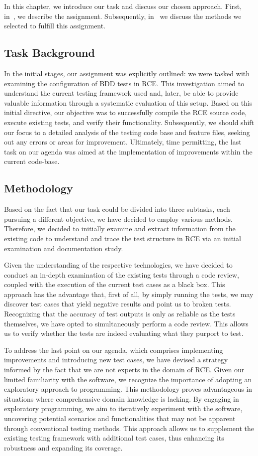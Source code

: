 In this chapter, we introduce our task and discuss our chosen approach. First, in~, we describe the assignment. Subsequently, in~ we discuss the methods we selected to fulfill this assignment.

\subsection{Task Background}
\label{subsec:Task}
In the initial stages, our assignment was explicitly outlined: we were tasked with examining the configuration of \ac{BDD} tests in \ac{RCE}. This investigation aimed to understand the current testing framework used and, later, be able to provide valuable information through a systematic evaluation of this setup. Based on this initial directive, our objective was to successfully compile the \ac{RCE} source code, execute existing tests, and verify their functionality. Subsequently, we should shift our focus to a detailed analysis of the testing code base and feature files, seeking out any errors or areas for improvement. Ultimately, time permitting, the last task on our agenda was aimed at the implementation of improvements within the current code-base.

\subsection{Methodology}
\label{subsec:Methodologies}
Based on the fact that our task could be divided into three subtasks, each pursuing a different objective, we have decided to employ various methods. Therefore, we decided to initially examine and extract information from the existing code to understand and trace the test structure in \ac{RCE} via an initial examination and documentation study.

Given the understanding of the respective technologies, we have decided to conduct an in-depth examination of the existing tests through a code review, coupled with the execution of the current test cases as a black box. This approach has the advantage that, first of all, by simply running the tests, we may discover test cases that yield negative results and point us to broken tests. Recognizing that the accuracy of test outputs is only as reliable as the tests themselves, we have opted to simultaneously perform a code review. This allows us to verify whether the tests are indeed evaluating what they purport to test. 

To address the last point on our agenda, which comprises implementing improvements and introducing new test cases, we have devised a strategy informed by the fact that we are not experts in the domain of \ac{RCE}. Given our limited familiarity with the software, we recognize the importance of adopting an exploratory approach to programming. This methodology proves advantageous in situations where comprehensive domain knowledge is lacking. By engaging in exploratory programming, we aim to iteratively experiment with the software, uncovering potential scenarios and functionalities that may not be apparent through conventional testing methods. This approach allows us to supplement the existing testing framework with additional test cases, thus enhancing its robustness and expanding its coverage.